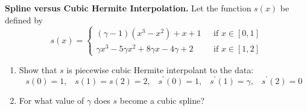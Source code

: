 \textbf{Spline versus Cubic Hermite Interpolation.} Let the function
$s(x)$ be defined by
\[
s(x) = \left\{
\begin{aligned}
(\gamma - 1)(x^3 - x^2) + x + 1 &\,\,\,\, \text{if}\,\, x\in [0,1] \\
\gamma x^3 - 5 \gamma x^2 + 8 \gamma x - 4 \gamma + 2 &\,\,\,\, \text{if}\,\, x\in [1,2]
\end{aligned}
\right.
\]

\begin{enumerate}
\item Show that $s$ is piecewise cubic Hermite interpolant to the
  data:
\[
s(0)=1, \;\;\; s(1)=s(2)=2, \;\;\; s^\prime(0)=1, \;\;\; s^\prime(1) =
\gamma, \;\;\; s^\prime(2)=0
\]
\item For what value of $\gamma$ does $s$ become a cubic spline?
\end{enumerate}

